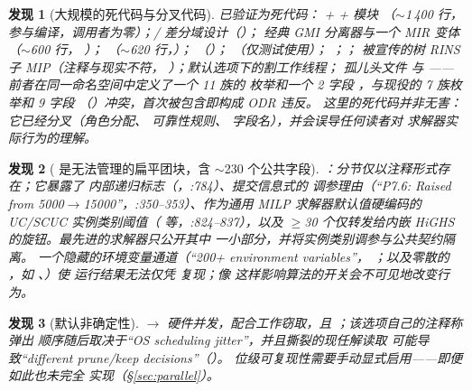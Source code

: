 \documentclass[11pt]{ctexart}
\newtheorem{finding}{发现}
\begin{document}
\begin{finding}[大规模的死代码与分叉代码]
已验证为死代码： +  +  模块
（$\sim$1\,400 行，参与编译，调用者为零）；/
 差分域设计（）；
经典 GMI 分离器与一个 MIR 变体（$\sim$600 行，
）；
（$\sim$620 行，）；
（）；
（仅测试使用）；
；；
被宣传的树 RINS 子 MIP（注释与现实不符，
）；默认选项下的割工作线程；
孤儿头文件  与
——前者\emph{在同一命名空间}中定义了一个
11 族的  枚举和一个 2 字段 ，与现役的
7 族枚举和 9 字段 
（）冲突，首次被包含即构成 ODR 违反。
这里的死代码并非无害：它已经分叉（角色分配、
可靠性规则、 字段名），并会误导任何读者对
求解器实际行为的理解。
\end{finding}

\begin{finding}[ 是无法管理的扁平团块，含 $\sim$230 个公共字段]
：分节仅以注释形式存在；它暴露了
内部递归标志（，:784）、提交信息式的
调参理由（“P7.6: Raised from 5000$\to$15000”，:350--353）、作为\emph{通用 MILP
求解器默认值}硬编码的 UC/SCUC
实例类别阈值（ 等，:824--837），以及 $\ge$30
个仅转发给内嵌 HiGHS 的旋钮。最先进的求解器只公开其中
一小部分，并将实例类别调参与公共契约隔离。
一个隐藏的环境变量通道（“200+ environment variables”，
；以及零散的 ，如
、）使
运行结果无法仅凭  复现；像
 这样影响算法的开关会不可见地改变行为。
\end{finding}

\begin{finding}[默认非确定性]
 $\to$ 硬件并发，配合工作窃取，且
；该选项自己的注释称弹出
顺序随后取决于“OS scheduling jitter”，并且撕裂的现任解读取
可能导致“different prune/keep decisions”（）。
位级可复现性需要手动显式启用——即便如此也未完全
实现（\S\ref{sec:parallel}）。
\end{finding}
\end{document}
